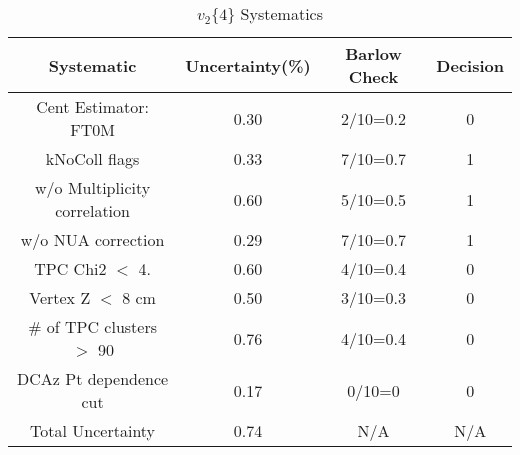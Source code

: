 \begin{table}[htbp]
\caption{$v_2\{4\}$ Systematics}
\label{tab:Sys_v24}
\centering
\begin{tabular}{|c|c|c|c|}
\hline
Systematic & Uncertainty(\%) & Barlow Check & Decision \\
\hline
Cent Estimator: FT0M & 0.30 & 2/10=0.2 & 0 \\
kNoColl flags & 0.33 & 7/10=0.7 & 1 \\
w/o Multiplicity correlation & 0.60 & 5/10=0.5 & 1 \\
w/o NUA correction & 0.29 & 7/10=0.7 & 1 \\
TPC Chi2 $<$ 4. & 0.60 & 4/10=0.4 & 0 \\
Vertex Z $<$ 8 cm & 0.50 & 3/10=0.3 & 0 \\
\# of TPC clusters $>$ 90 & 0.76 & 4/10=0.4 & 0 \\
DCAz Pt dependence cut & 0.17 & 0/10=0 & 0 \\
\hline
Total Uncertainty & 0.74 & N/A & N/A \\
\hline
\end{tabular}
\end{table}
